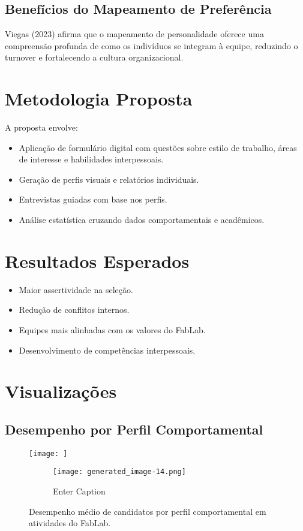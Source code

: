 \documentclass[12pt]{article}
\begin{document}
\subsection{Benefícios do Mapeamento de Preferência}
Viegas (2023) afirma que o mapeamento de personalidade oferece uma compreensão profunda de como os indivíduos se integram à equipe, reduzindo o turnover e fortalecendo a cultura organizacional.

\section{Metodologia Proposta}
A proposta envolve:
\begin{itemize}
    \item Aplicação de formulário digital com questões sobre estilo de trabalho, áreas de interesse e habilidades interpessoais.
    \item Geração de perfis visuais e relatórios individuais.
    \item Entrevistas guiadas com base nos perfis.
    \item Análise estatística cruzando dados comportamentais e acadêmicos.
\end{itemize}

\section{Resultados Esperados}
\begin{itemize}
    \item Maior assertividade na seleção.
    \item Redução de conflitos internos.
    \item Equipes mais alinhadas com os valores do FabLab.
    \item Desenvolvimento de competências interpessoais.
\end{itemize}

\section{Visualizações}
\subsection{Desempenho por Perfil Comportamental}
\begin{figure}[H]
    \centering
    \texttt{[image: ]}
\begin{figure}
        \centering
        \texttt{[image: generated\_image-14.png]}
        \caption{Enter Caption}
        \label{fig:placeholder}
    \end{figure}
        \caption{Desempenho médio de candidatos por perfil comportamental em atividades do FabLab.}
    \label{fig:desempenho_perfil}
\end{figure}
\end{document}
